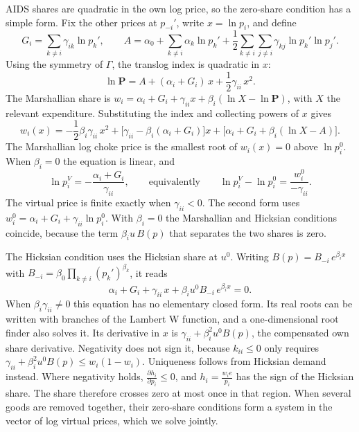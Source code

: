 AIDS shares are quadratic in the own log price, so the zero-share condition has a simple form. Fix the other prices at
$p_{-i}'$, write $x = \ln p_i$, and define
\begin{equation*}
  G_i = \sum_{k\neq i}\gamma_{ik}\ln p_k', \qquad
  A = \alpha_0 + \sum_{k\neq i}\alpha_k\ln p_k' + \frac{1}{2}\sum_{k\neq i}\sum_{j\neq i}\gamma_{kj}\ln p_k'\ln p_j'.
\end{equation*}
Using the symmetry of $\Gamma$, the translog index is quadratic in $x$:
\begin{equation*}
  \ln\mathbf{P} = A + (\alpha_i + G_i)\,x + \frac{1}{2}\gamma_{ii}\,x^2.
\end{equation*}
The Marshallian share is $w_i = \alpha_i + G_i + \gamma_{ii}x + \beta_i(\ln X - \ln\mathbf{P})$, with $X$ the
relevant expenditure. Substituting the index and collecting powers of $x$ gives
\begin{equation}\label{eq:05-virtual-quadratic}
  w_i(x) = -\frac{1}{2}\beta_i\gamma_{ii}\,x^2 + \bigl[\gamma_{ii} - \beta_i(\alpha_i + G_i)\bigr]x
  + \bigl[\alpha_i + G_i + \beta_i(\ln X - A)\bigr].
\end{equation}
The Marshallian log choke price is the smallest root of $w_i(x) = 0$ above $\ln p_i^0$. When $\beta_i = 0$ the
equation is linear, and
\begin{equation}\label{eq:05-virtual-beta0}
  \ln p_i^V = -\frac{\alpha_i + G_i}{\gamma_{ii}}, \qquad\text{equivalently}\qquad
  \ln p_i^V - \ln p_i^0 = \frac{w_i^0}{-\gamma_{ii}}.
\end{equation}
The virtual price is finite exactly when $\gamma_{ii} < 0$. The second form uses
$w_i^0 = \alpha_i + G_i + \gamma_{ii}\ln p_i^0$. With $\beta_i = 0$ the Marshallian and Hicksian conditions
coincide, because the term $\beta_i u\,B(p)$ that separates the two shares is zero.

The Hicksian condition uses the Hicksian share at $u^0$. Writing $B(p) = B_{-i}\,e^{\beta_i x}$ with
$B_{-i} = \beta_0\prod_{k\neq i}(p_k')^{\beta_k}$, it reads
\begin{equation}\label{eq:05-virtual-hicks}
  \alpha_i + G_i + \gamma_{ii}\,x + \beta_i u^0 B_{-i}\,e^{\beta_i x} = 0.
\end{equation}
When $\beta_i\gamma_{ii} \neq 0$ this equation has no elementary closed form. Its real roots can be written
with branches of the Lambert W function, and a one-dimensional root finder also solves it. Its
derivative in $x$ is $\gamma_{ii} + \beta_i^2u^0B(p)$, the compensated own share derivative. Negativity does not
sign it, because $k_{ii} \le 0$ only requires $\gamma_{ii} + \beta_i^2u^0B(p) \le w_i(1 - w_i)$. Uniqueness
follows from Hicksian demand instead. Where negativity holds, $\frac{\partial h_i}{\partial p_i} \le 0$, and
$h_i = \frac{w_ie}{p_i}$ has the sign of the Hicksian share. The share therefore crosses zero at most once in that
region. When several goods are
removed together, their zero-share conditions form a system in the vector of log virtual prices, which we solve
jointly.

